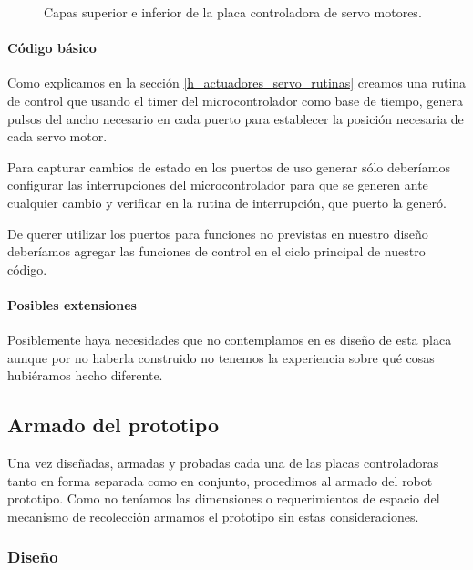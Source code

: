 \begin{figure}
	\caption{Capas superior e inferior de la placa controladora de servo motores.}
	\label{hF_placa_servo_capas}
\end{figure}

\paragraph{C\'odigo b\'asico}
\label{h_placas_servos_codigo}

Como explicamos en la secci\'on \ref{h_actuadores_servo_rutinas} creamos una rutina de control
que usando el timer del microcontrolador como base de tiempo, genera pulsos del ancho necesario
en cada puerto para establecer la posici\'on necesaria de cada servo motor.

Para capturar cambios de estado en los puertos de uso generar s\'olo deber\'iamos configurar las
interrupciones del microcontrolador para que se generen ante cualquier cambio y verificar en la
rutina de interrupci\'on, que puerto la gener\'o.

De querer utilizar los puertos para funciones no previstas en nuestro dise\~no deber\'iamos
agregar las funciones de control en el ciclo principal de nuestro c\'odigo.

\paragraph{Posibles extensiones}
\label{h_placas_servos_extensiones}

Posiblemente haya necesidades que no contemplamos en es dise\~no de esta placa aunque por no
haberla construido no tenemos la experiencia sobre qu\'e cosas hubi\'eramos hecho diferente.

\subsection{Armado del prototipo}
\label{h_prototipo}

Una vez dise\~nadas, armadas y probadas cada una de las placas controladoras tanto en forma separada
como en conjunto, procedimos al armado del robot prototipo.
Como no ten\'iamos las dimensiones o requerimientos de espacio del mecanismo de recolecci\'on
armamos el prototipo sin estas consideraciones.

\subsubsection{Dise\~no}
\label{h_prototipo_disenio}

